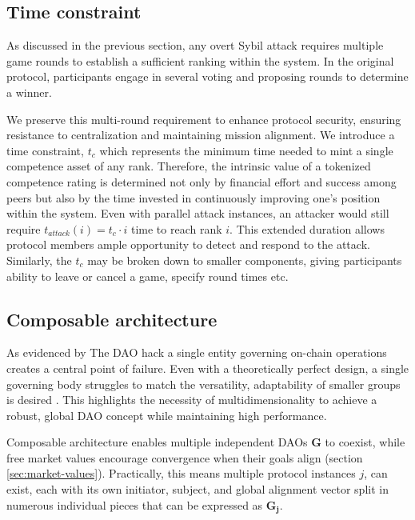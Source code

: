 \documentclass{article}
\begin{document}
\begin{CJK}{UTF8}{gbsn}
\begin{multicols}{2}
            \subsection{Time constraint}

            As discussed in the previous section, any overt Sybil attack requires multiple game rounds to establish a sufficient ranking within the system. In the original protocol, participants engage in several voting and proposing rounds to determine a winner.

            We preserve this multi-round requirement to enhance protocol security, ensuring resistance to centralization and maintaining mission alignment. We introduce a time constraint,  $t_c$ which represents the minimum time needed to mint a single competence asset of any rank.
            Therefore, the intrinsic value of a tokenized competence rating is determined not only by financial effort and success among peers but also by the time invested in continuously improving one's position within the system. Even with parallel attack instances, an attacker would still require $t_{attack}(i) = t_c \cdot i$ time to reach rank $i$. This extended duration allows protocol members ample opportunity to detect and respond to the attack. Similarly, the $t_c$ may be broken down to smaller components, giving participants ability to leave or cancel a game, specify round times etc.


            \subsection{Composable architecture}
            As evidenced by The DAO hack\cite{Liu2021} a single entity governing on-chain operations creates a central point of failure. Even with a theoretically perfect design, a single governing body struggles to match the versatility, adaptability of smaller groups is desired \cite{Buterin22}.  This highlights the necessity of multidimensionality to achieve a robust, global DAO concept while maintaining high performance.

            Composable architecture enables multiple independent DAOs $\mathbf{G}$ to coexist, while free market values encourage convergence when their goals align (section \ref{sec:market-values}). Practically, this means multiple protocol instances $j$, can exist, each with its own initiator, subject, and global alignment vector split in numerous individual pieces that can be expressed as $\mathbf{G_j}$. \\


\end{multicols}
\end{CJK}
\end{document}
